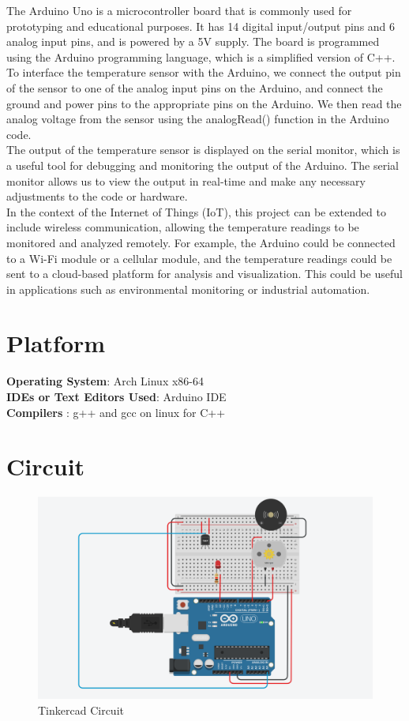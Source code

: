 \documentclass[11pt]{article}
\begin{document}
The Arduino Uno is a microcontroller board that is commonly used for prototyping and educational purposes. It has 14 digital input/output pins and 6 analog input pins, and is powered by a 5V supply. The board is programmed using the Arduino programming language, which is a simplified version of C++.\\

To interface the temperature sensor with the Arduino, we connect the output pin of the sensor to one of the analog input pins on the Arduino, and connect the ground and power pins to the appropriate pins on the Arduino. We then read the analog voltage from the sensor using the analogRead() function in the Arduino code.\\

The output of the temperature sensor is displayed on the serial monitor, which is a useful tool for debugging and monitoring the output of the Arduino. The serial monitor allows us to view the output in real-time and make any necessary adjustments to the code or hardware.\\

In the context of the Internet of Things (IoT), this project can be extended to include wireless communication, allowing the temperature readings to be monitored and analyzed remotely. For example, the Arduino could be connected to a Wi-Fi module or a cellular module, and the temperature readings could be sent to a cloud-based platform for analysis and visualization. This could be useful in applications such as environmental monitoring or industrial automation.


\section{Platform}
\textbf{Operating System}: Arch Linux x86-64 \\
\textbf{IDEs or Text Editors Used}: Arduino IDE\\
\textbf{Compilers} : g++ and gcc on linux for C++\\

\section{Circuit}
\begin{figure}[H]
	\centering
	\includegraphics[width=.95\textwidth]{Screenshot_on_2023-05-02_at_00-05-46.png}
	\caption{Tinkercad Circuit}
\end{figure}
\end{document}
